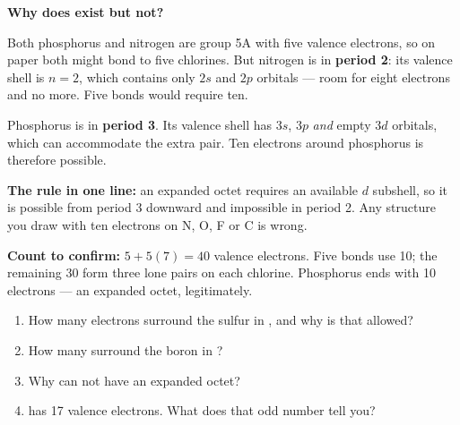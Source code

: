 \documentclass{apchem-worksheet}
\begin{document}
\begin{workedexample}
\textbf{Why does  exist but  not?}

Both phosphorus and nitrogen are group 5A with five valence electrons,
so on paper both might bond to five chlorines. But nitrogen is in
\textbf{period 2}: its valence shell is $n = 2$, which contains only
$2s$ and $2p$ orbitals --- room for eight electrons and no more. Five
bonds would require ten.

Phosphorus is in \textbf{period 3}. Its valence shell has $3s$, $3p$
\emph{and} empty $3d$ orbitals, which can accommodate the extra pair. Ten
electrons around phosphorus is therefore possible.

\textbf{The rule in one line:} an expanded octet requires an available
$d$ subshell, so it is possible from period 3 downward and impossible
in period 2. Any structure you draw with ten electrons on N, O, F or C
is wrong.

\textbf{Count  to confirm:} $5 + 5(7) = 40$ valence electrons.
Five  bonds use 10; the remaining 30 form three lone pairs on
each chlorine. Phosphorus ends with 10 electrons --- an expanded octet,
legitimately.
\end{workedexample}

\begin{yourturn}
\begin{enumerate}[leftmargin=*,itemsep=0.5em]
  \item How many electrons surround the sulfur in , and why is
        that allowed? \workspace[1.6cm]
  \item How many surround the boron in ? \workspace[1.4cm]
  \item Why can  not have an expanded octet? \workspace[1.4cm]
  \item {} has 17 valence electrons. What does that odd number
        tell you? \workspace[1.6cm]
\end{enumerate}
\end{yourturn}
\end{document}
